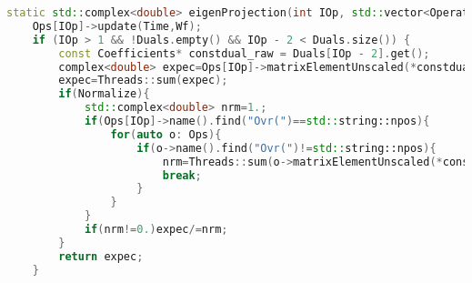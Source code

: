 \begin{lstlisting}[language=C++, basicstyle=\tiny]
static std::complex<double> eigenProjection(int IOp, std::vector<OperatorAbstract*> Ops, double Time, const Coefficients* Wf,bool Normalize, std::vector<std::shared_ptr<Coefficients>> Duals){
    Ops[IOp]->update(Time,Wf);
    if (IOp > 1 && !Duals.empty() && IOp - 2 < Duals.size()) {
        const Coefficients* constdual_raw = Duals[IOp - 2].get();
        complex<double> expec=Ops[IOp]->matrixElementUnscaled(*constdual_raw,*Wf);
        expec=Threads::sum(expec);
        if(Normalize){
            std::complex<double> nrm=1.;
            if(Ops[IOp]->name().find("Ovr(")==std::string::npos){
                for(auto o: Ops){
                    if(o->name().find("Ovr(")!=std::string::npos){
                        nrm=Threads::sum(o->matrixElementUnscaled(*constdual_raw,*Wf));
                        break;
                    }
                }
            }
            if(nrm!=0.)expec/=nrm;
        }
        return expec;
    }
\end{lstlisting}
    
